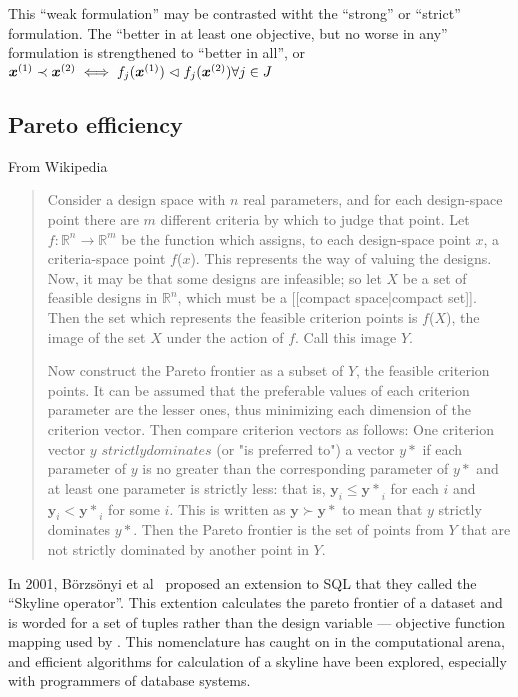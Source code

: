 This ``weak formulation'' may be contrasted witht the ``strong'' or
``strict'' formulation.  The ``better in at least one objective, but
no worse in any'' formulation is strengthened to ``better in all'', or
$\boldsymbol{x}^{(1)} \prec \boldsymbol{x}^{(2)} \iff f_j(\boldsymbol{x}^{(1)})
\vartriangleleft f_j(\boldsymbol{x}^{(2)}) \forall j \in J$

\subsection{Pareto efficiency}
From Wikipedia
\begin{quote}
  Consider a design space with $n$ real parameters, and for each
  design-space point there are $m$ different criteria by which to
  judge that point. Let $f : \mathbb{R}^n \rightarrow \mathbb{R}^m$ be
  the function which assigns, to each design-space point $x$, a
  criteria-space point $f$($x$). This represents the way of valuing
  the designs. Now, it may be that some designs are infeasible; so let
  $X$ be a set of feasible designs in ${\mathbb{R}}^n$, which must be
  a [[compact space|compact set]]. Then the set which represents the
  feasible criterion points is $f$($X$), the image of the set $X$
  under the action of $f$. Call this image $Y$.

  Now construct the Pareto frontier as a subset of $Y$, the feasible
  criterion points. It can be assumed that the preferable values of
  each criterion parameter are the lesser ones, thus minimizing each
  dimension of the criterion vector. Then compare criterion vectors as
  follows: One criterion vector $y$ $strictly dominates$ (or "is
  preferred to") a vector $y*$ if each parameter of $y$ is no greater
  than the corresponding parameter of $y*$ and at least one parameter
  is strictly less: that is, $\mathbf{y}_i \le \mathbf{y*}_i$ for each
  $i$ and $\mathbf{y}_i < \mathbf{y*}_i$ for some $i$. This is written
  as $\mathbf{y} \succ \mathbf{y*}$ to mean that $y$ strictly
  dominates $y*$. Then the Pareto frontier is the set of points from
  $Y$ that are not strictly dominated by another point in $Y$.
\end{quote}

In 2001, B\"orzs\"onyi et al \citehere\ proposed an extension to SQL
that they called the ``Skyline operator''.  This extention calculates
the pareto frontier of a dataset and is worded for a set of tuples
rather than the design variable --- objective function mapping used by
\citet{deb.kalyanmoy2001multi-objective}.  This nomenclature has caught
on in the computational arena, and efficient algorithms for
calculation of a skyline have been explored, especially with
programmers of database systems.

